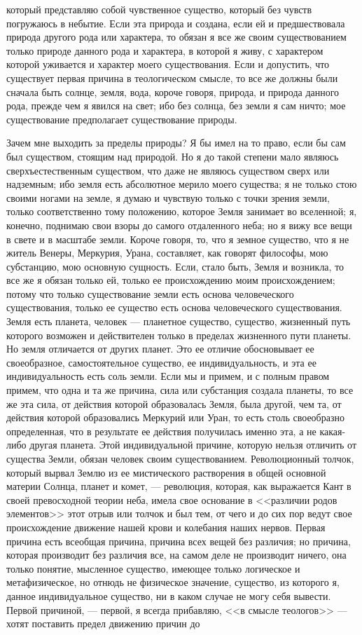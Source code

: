 \documentclass[12pt]{article}
\begin{document}
который представляю собой чувственное существо, который без чувств погружаюсь в небытие. Если эта природа и создана, если ей и предшествовала природа другого рода или характера, то обязан я все же своим существованием только природе данного рода и характера, в которой я живу, с характером которой уживается и характер моего существования. Если и допустить, что существует первая причина в теологическом смысле, то все же должны были сначала быть солнце, земля, вода, короче говоря, природа, и природа данного рода, прежде чем я явился на свет; ибо без солнца, без земли я сам ничто; мое существование предполагает существование природы. 

Зачем мне выходить за пределы природы? Я бы имел на то право, если бы сам был существом, стоящим над природой. Но я до такой степени мало являюсь сверхъестественным существом, что даже не являюсь существом сверх или надземным; ибо земля есть абсолютное мерило моего существа; я не только стою своими ногами на земле, я думаю и чувствую только с точки зрения земли, только соответственно тому положению, которое Земля занимает во вселенной; я, конечно, поднимаю свои взоры до самого отдаленного неба; но я вижу все вещи в свете и в масштабе земли. Короче говоря, то, что я земное существо, что я не житель Венеры, Меркурия, Урана, составляет, как говорят философы, мою субстанцию, мою основную сущность. Если, стало быть, Земля и возникла, то все же я обязан только ей, только ее происхождению моим происхождением; потому что только существование земли есть основа человеческого существования, только ее существо есть основа человеческого существования. Земля есть планета, человек --- планетное существо, существо, жизненный путь которого возможен и действителен только в пределах жизненного пути планеты. Но земля отличается от других планет. Это ее отличие обосновывает ее своеобразное, самостоятельное существо, ее индивидуальность, и эта ее индивидуальность есть соль земли. Если мы и примем, и с полным правом примем, что одна и та же причина, сила или субстанция создала планеты, то все же эта сила, от действия которой образовалась Земля, была другой, чем та, от действия которой образовались Меркурий или Уран, то есть столь своеобразно определенная, что в результате ее действия получилась именно эта, а не какая-либо другая планета. Этой индивидуальной причине, которую нельзя отличить от существа Земли, обязан человек своим существованием. Революционный толчок, который вырвал Землю из ее мистического растворения в общей основной материи Солнца, планет и комет, --- революция, которая, как выражается Кант в своей превосходной теории неба, имела свое основание в <<различии родов элементов>>  этот отрыв или толчок и был тем, от чего и до сих пор ведут свое происхождение движение нашей крови и колебания наших нервов. Первая причина есть всеобщая причина, причина всех вещей без различия; но причина, которая производит без различия все, на самом деле не производит ничего, она только понятие, мысленное существо, имеющее только логическое и метафизическое, но отнюдь не физическое значение, существо, из которого я, данное индивидуальное существо, ни в каком случае не могу себя вывести. Первой причиной, --- первой, я всегда прибавляю, <<в смысле теологов>> --- хотят поставить предел движению причин до 
\end{document}
